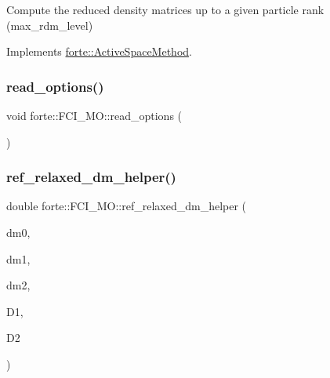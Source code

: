Compute the reduced density matrices up to a given particle rank (max\+\_\+rdm\+\_\+level) 



Implements \mbox{\hyperlink{classforte_1_1_active_space_method_a0b2c4903551a7602db815d67349ba7c9}{forte\+::\+Active\+Space\+Method}}.

\mbox{\label{classforte_1_1_f_c_i___m_o_a9318660ce1439ebdbce55d7b0b97dd15}} 
\subsubsection{\texorpdfstring{read\+\_\+options()}{read\_options()}}
{\footnotesize\ttfamily void forte\+::\+F\+C\+I\+\_\+\+M\+O\+::read\+\_\+options (\begin{DoxyParamCaption}{ }\end{DoxyParamCaption})\hspace{0.3cm}{\ttfamily [protected]}}

\mbox{\label{classforte_1_1_f_c_i___m_o_ab7fb146f2fdf1b80b57629d9ac77dd04}} 
\subsubsection{\texorpdfstring{ref\+\_\+relaxed\+\_\+dm\+\_\+helper()}{ref\_relaxed\_dm\_helper()}\hspace{0.1cm}{\footnotesize\ttfamily [1/2]}}
{\footnotesize\ttfamily double forte\+::\+F\+C\+I\+\_\+\+M\+O\+::ref\+\_\+relaxed\+\_\+dm\+\_\+helper (\begin{DoxyParamCaption}\item[{const double \&}]{dm0,  }\item[{ambit\+::\+Blocked\+Tensor \&}]{dm1,  }\item[{ambit\+::\+Blocked\+Tensor \&}]{dm2,  }\item[{ambit\+::\+Blocked\+Tensor \&}]{D1,  }\item[{ambit\+::\+Blocked\+Tensor \&}]{D2 }\end{DoxyParamCaption})\hspace{0.3cm}{\ttfamily [protected]}}

